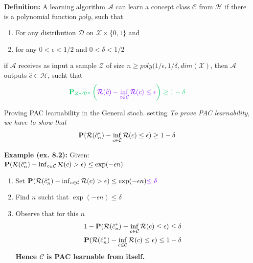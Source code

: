 \textbf{Definition: } A learning algorithm $\mathcal A$ can learn a concept class $\mathcal C$ from $\mathcal H$ if there is a {\color{imp3} polynomial function $\mathit{poly}$}, such that
\begin{enumerate}
	\item For any distribution $\mathcal D$ on $\mathcal X\times \{0,1\}$ and
	\item for any {\color{imp}$0<\epsilon<1/2$} and {\color{imp2}$0<\delta<1/2$}
\end{enumerate}
if $\mathcal A$ receives as input {\color{imp3} a sample $\mathcal Z$ of size $n\geq \mathit{poly}(1/\epsilon, 1/\delta, \mathit{dim}(\mathcal X)$}, then $\mathcal A$ outputs $\hat c\in\mathcal H$, sucht that
$$
	{\color{imp2}\P_{\mathcal Z\sim \mathcal D^n}\left({\color{imp}\mathcal R(\hat c) - \inf_{c\in\mathcal C}\mathcal R(c)\leq \epsilon }\right) \geq 1 - \delta}
$$

\begin{highlight}{Proving PAC learnability in the General stoch. setting}
\textit{To prove PAC learnability, we have to show that}
$$
	\P(\mathcal R(\hat{c}_n^*) - \inf_{c\in \mathcal C} \mathcal R(c) \leq \epsilon) \geq 1 - \delta
$$

\sepline
\textbf{Example (ex. 8.2): }
Given: \\
$\P(\mathcal R(\hat{c}_n^*) - \inf_{c\in \mathcal C} \mathcal R(c) > \epsilon) \leq \exp(-\epsilon n)$

\begin{enumerate}
	\item Set $\P(\mathcal R(\hat{c}_n^*) - \inf_{c\in \mathcal C} \mathcal R(c) > \epsilon) \leq \exp(-\epsilon n) {\color{imp}\leq \delta}$
	\item Find $n$ sucht that $\exp(-\epsilon n) \leq \delta$
	\item Observe that for this $n$
	\begin{equation*}
		\begin{gathered}
			1 - \P(\mathcal R(\hat{c}_n^*) - \inf_{c\in \mathcal C} \mathcal R(c) \leq \epsilon) \leq \delta \\
			\P(\mathcal R(\hat{c}_n^*) - \inf_{c\in \mathcal C} \mathcal R(c) \leq \epsilon) \leq 1 -\delta
		\end{gathered}
	\end{equation*}
	\textbf{Hence $\mathcal C$ is PAC learnable from itself.}
\end{enumerate}

\end{highlight}
